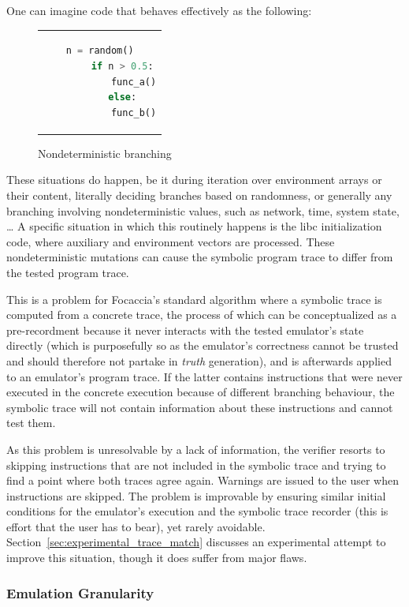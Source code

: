 One can imagine code that behaves effectively as the following:

\begin{figure}[htbp]
    \centering
    \begin{tabular}{c}
    \begin{lstlisting}[language=Python]
        n = random()
        if n > 0.5:
            func_a()
        else:
            func_b()
    \end{lstlisting}
    \end{tabular}
    \caption{Nondeterministic branching}\label{fig:random_branching}
\end{figure}

These situations do happen, be it during iteration over environment arrays or their content, literally deciding branches
based on randomness, or generally any branching involving nondeterministic values, such as network, time, system state,
… A specific situation in which this routinely happens is the libc initialization code, where auxiliary and environment
vectors are processed. These nondeterministic mutations can cause the symbolic program trace to differ from the tested
program trace.

This is a problem for Focaccia's standard algorithm where a symbolic trace is computed from a concrete trace, the
process of which can be conceptualized as a pre-recordment because it never interacts with the tested emulator's state
directly (which is purposefully so as the emulator's correctness cannot be trusted and should therefore not partake in
\textit{truth} generation), and is afterwards applied to an emulator's program trace. If the latter contains
instructions that were never executed in the concrete execution because of different branching behaviour, the symbolic
trace will not contain information about these instructions and cannot test them.

As this problem is unresolvable by a lack of information, the verifier resorts to skipping instructions that are not
included in the symbolic trace and trying to find a point where both traces agree again. Warnings are issued to the user
when instructions are skipped. The problem is improvable by ensuring similar initial conditions for the emulator's
execution and the symbolic trace recorder (this is effort that the user has to bear), yet rarely avoidable.
Section~\ref{sec:experimental_trace_match} discusses an experimental attempt to improve this situation, though it does
suffer from major flaws.

\subsubsection{Emulation Granularity}

